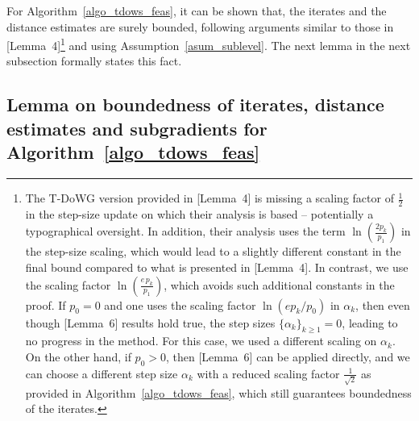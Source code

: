 \documentclass{article}
\def\a{\alpha}
\theoremstyle{plain}
\theoremstyle{definition}
\theoremstyle{remark}
\begin{document}
For Algorithm~\ref{algo_tdows_feas}, it can be shown that, the iterates and the distance estimates are surely bounded, following arguments similar to those in \cite{khaled2023dowg} [Lemma~4]\footnote{The T-DoWG version provided in \cite{khaled2023dowg} [Lemma~4] is missing a scaling factor of $\tfrac{1}{2}$ in the step-size update on which their analysis is based -- potentially a typographical oversight. In addition, their analysis uses the term $\ln\!\left(\tfrac{2p_k}{p_1}\right)$ in the step-size scaling, which would lead to a slightly different constant in the final bound compared to what is presented in \cite{khaled2023dowg} [Lemma~4]. In contrast, we use the scaling factor $\ln\!\left(\tfrac{e\, p_k}{p_1}\right)$, which avoids such additional constants in the proof. If $p_0 = 0$ and one uses the scaling factor $\ln(ep_k/p_0)$ in $\alpha_k$, then even though \cite{ivgi2023dog} [Lemma~6] results hold true, the step sizes $\{\alpha_k\}_{k \geq 1} = 0$, leading to no progress in the method. For this case, we used a different scaling on $\alpha_k$. On the other hand, if $p_0 >0$, then \cite{ivgi2023dog} [Lemma~6] can be applied directly, and we can choose a different step size $\a_k$ with a reduced scaling factor $\tfrac{1}{\sqrt{2}}$ as provided in Algorithm~\ref{algo_tdows_feas}, which still guarantees boundedness of the iterates.} and using Assumption~\ref{asum_sublevel}. The next lemma in the next subsection formally states this fact.



\subsection{Lemma on boundedness of iterates, distance estimates and subgradients for Algorithm~\ref{algo_tdows_feas}}\label{lem_bounded_itr_tdows_proof}
\end{document}
